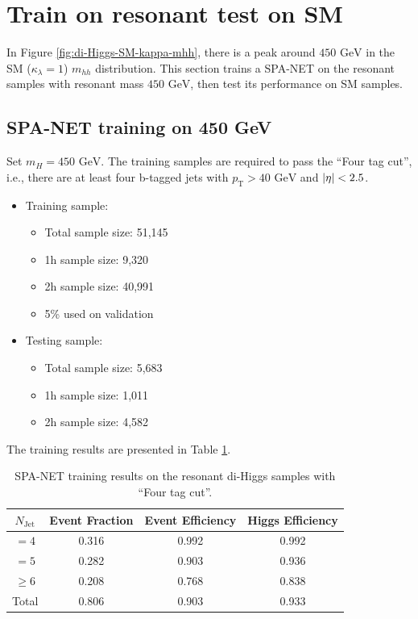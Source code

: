\documentclass[12pt]{article}
\begin{document}
\section{Train on resonant test on SM}%
\label{sec:train_on_resonant_test_on_sm}
	In Figure \ref{fig:di-Higgs-SM-kappa-mhh}, there is a peak around $\text{450 GeV}$ in the SM ($\kappa_\lambda = 1$) $m_{hh}$ distribution. This section trains a SPA-NET on the resonant samples with resonant mass $\text{450 GeV}$, then test its performance on SM samples.

	\subsection{SPA-NET training on 450 GeV}%
	\label{sub:spa_net_training_on_450_gev}
		Set $m_H = \text{450 GeV}$. The training samples are required to pass the ``Four tag cut'', i.e., there are at least four b-tagged jets with $p_{\text{T}} > \text{40 GeV}$ and $\abs{\eta} < 2.5$.
		\begin{itemize}
			\item Training sample:
			\begin{itemize}
				\item Total sample size: 51,145
				\item 1h sample size: 9,320
				\item 2h sample size: 40,991
				\item 5\% used on validation
			\end{itemize}
			\item Testing sample: 
			\begin{itemize}
				\item Total sample size: 5,683
				\item 1h sample size: 1,011
				\item 2h sample size: 4,582
			\end{itemize}
		\end{itemize}
		The training results are presented in Table \ref{tab:SPANet_diHiggs_4btag_pt40_450GeV}.
		\begin{table}[htpb]
			\centering
			\caption{SPA-NET training results on the resonant di-Higgs samples with ``Four tag cut''.}
			\label{tab:SPANet_diHiggs_4btag_pt40_450GeV}
			\begin{tabular}{c|c|cc}
				$N_\text{Jet}$ & Event Fraction & Event Efficiency & Higgs Efficiency \\
				\hline
				$=4$	  &   0.316             &    0.992              &    0.992             \\
				$=5$	  &   0.282             &    0.903              &    0.936             \\
				$\ge 6$	  &   0.208             &    0.768              &    0.838             \\
				Total	  &   0.806             &    0.903              &    0.933             \\
			\end{tabular}
		\end{table}
\end{document}
